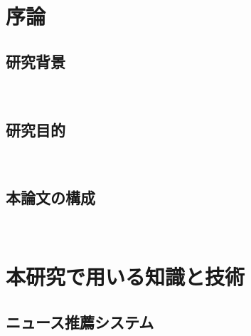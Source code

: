 \documentclass[12pt,a4j]{jreport}
\begin{document}



\chapter{序論}

\section{研究背景}
~

\section{研究目的}
~

\section{本論文の構成}
~

\chapter{本研究で用いる知識と技術}


\section{ニュース推薦システム}
~
\end{document}
